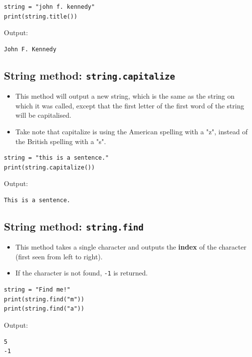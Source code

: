 \documentclass[11pt]{article}
\begin{document}
\begin{verbatim}
string = "john f. kennedy"
print(string.title())
\end{verbatim}

 \noindent Output:

\begin{verbatim}
John F. Kennedy
\end{verbatim}

\subsection{String method: \texttt{string.capitalize}}
\label{sec:org9449f54}
\begin{itemize}
\item This method will output a new string, which is the same as the string on which it was called, except that the first letter of the first word of the string will be capitalised.
\item Take note that capitalize is using the American spelling with a "z", instead of the British spelling with a "s".
\end{itemize}

\begin{verbatim}
string = "this is a sentence."
print(string.capitalize())
\end{verbatim}

 \noindent Output:

\begin{verbatim}
This is a sentence.
\end{verbatim}

\subsection{String method: \texttt{string.find}}
\label{sec:org6f02b89}
\begin{itemize}
\item This method takes a single character and outputs the \textbf{index} of the character (first seen from left to right).
\item If the character is not found, \texttt{-1} is returned.
\end{itemize}

\begin{verbatim}
string = "Find me!"
print(string.find("m"))
print(string.find("a"))
\end{verbatim}

 \noindent Output:

\begin{verbatim}
5
-1
\end{verbatim}
\end{document}
